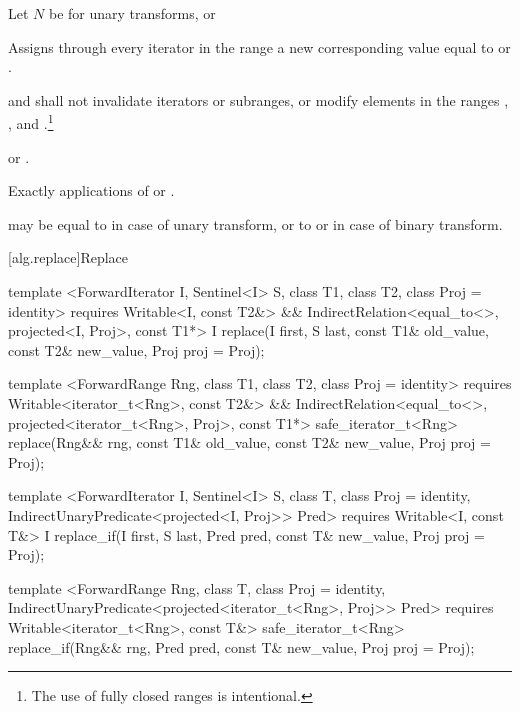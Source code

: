 \begin{itemdescr}
\pnum
Let $N$ be 
for unary transforms, or 

\pnum
\effects
Assigns through every iterator
in the range
a new
corresponding value equal to
or
.

\pnum
\requires
{} and 
shall not invalidate iterators or subranges, or modify elements in the ranges
,
,
and
.\footnote{The use of fully
closed ranges is intentional.}

\pnum
\returns
{}
 or .

\pnum
\complexity
Exactly
applications of
 or .

\pnum
\notes
{} may be equal to 
in case of unary transform,
or to  or 
in case of binary transform.
\end{itemdescr}

[alg.replace]{Replace}

%
%
\begin{itemdecl}
template <ForwardIterator I, Sentinel<I> S, class T1, class T2, class Proj = identity>
  requires Writable<I, const T2&> &&
    IndirectRelation<equal_to<>, projected<I, Proj>, const T1*>
  I
    replace(I first, S last, const T1& old_value, const T2& new_value, Proj proj = Proj{});

template <ForwardRange Rng, class T1, class T2, class Proj = identity>
  requires Writable<iterator_t<Rng>, const T2&> &&
    IndirectRelation<equal_to<>, projected<iterator_t<Rng>, Proj>, const T1*>
  safe_iterator_t<Rng>
    replace(Rng&& rng, const T1& old_value, const T2& new_value, Proj proj = Proj{});

template <ForwardIterator I, Sentinel<I> S, class T, class Proj = identity,
    IndirectUnaryPredicate<projected<I, Proj>> Pred>
  requires Writable<I, const T&>
  I
    replace_if(I first, S last, Pred pred, const T& new_value, Proj proj = Proj{});

template <ForwardRange Rng, class T, class Proj = identity,
    IndirectUnaryPredicate<projected<iterator_t<Rng>, Proj>> Pred>
  requires Writable<iterator_t<Rng>, const T&>
  safe_iterator_t<Rng>
    replace_if(Rng&& rng, Pred pred, const T& new_value, Proj proj = Proj{});
\end{itemdecl}

